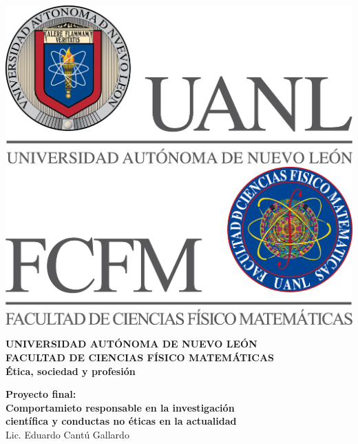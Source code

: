 \begin{titlepage}
\begin{center}
\includegraphics[scale=0.40]{../../Logos/uanl.png} 
\hspace{2.5cm}
\includegraphics[scale=0.40]{../../Logos/fcfm.png}
\end{center}
\vspace{1.5cm}
\begin{center}
\large{\textbf{
UNIVERSIDAD AUTÓNOMA DE NUEVO LEÓN\\
FACULTAD DE CIENCIAS
FÍSICO MATEMÁTICAS}}\\
\vspace*{2.5cm}
\Large{\textbf{Ética, sociedad y profesión}} \vspace{1cm}\\
\begin{large}
\textbf{Proyecto final: \vspace{0.5cm}\\ Comportamieto responsable en la 
investigación\\ científica y conductas no éticas  en la actualidad\vspace{0.5cm}\\}
Lic. Eduardo Cantú Gallardo\\
\end{large}
\vspace{3.5cm}
\begin{minipage}{0.6\linewidth}

\end{minipage}
\end{center}
\end{titlepage}
